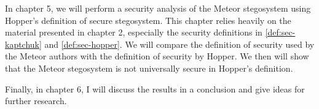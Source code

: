 In chapter 5, we will perform a security analysis of the Meteor stegosystem using Hopper's definition of secure stegosystem.
This chapter relies heavily on the material presented in chapter 2, especially the security definitions in \autoref{def:sec-kaptchuk} and \autoref{def:sec-hopper}.
We will compare the definition of security used by the Meteor authors with the definition of security by Hopper.
We then will show that the Meteor stegosystem is not universally secure in Hopper's definition.

Finally, in chapter 6, I will discuss the results in a conclusion and give ideas for further research.